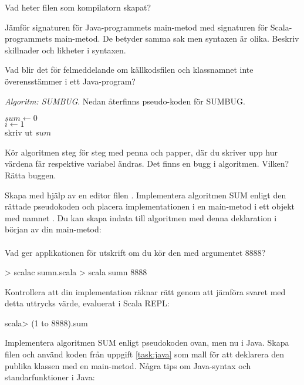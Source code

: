 \Subtask\Pen Vad heter filen som kompilatorn skapat?

\Subtask\Pen Jämför signaturen för Java-programmets main-metod med signaturen för Scala-programmets main-metod. De betyder samma sak men syntaxen är olika. Beskriv skillnader och likheter i syntaxen.

\Subtask\Pen Vad blir det för felmeddelande om källkodsfilen och klassnamnet inte överensstämmer i ett Java-program?


\Task \emph{Algoritm: SUMBUG}. Nedan återfinns pseudo-koden för SUMBUG. 

\begin{algorithm}[H]
 
 $sum \leftarrow 0$ \\
 $i \leftarrow 1$  \\
 skriv ut $sum$
\end{algorithm}

\Subtask\Pen Kör algoritmen steg för steg med penna och papper, där du skriver upp hur värdena fär respektive variabel ändras. Det finns en bugg i algoritmen. Vilken? Rätta buggen.

\Subtask Skapa med hjälp av en editor filen . Implementera algoritmen SUM enligt den rättade pseudokoden och placera implementationen i en main-metod i ett objekt med namnet . Du kan skapa indata  till algoritmen med denna deklaration i början av din main-metod: \\  \\ Vad ger applikationen för utskrift om du kör den med argumentet 8888? 

\begin{REPLnonum}
> scalac sumn.scala
> scala sumn 8888
\end{REPLnonum}

\Subtask Kontrollera att din implementation räknar rätt genom att jämföra svaret med detta uttrycks värde, evaluerat i Scala REPL:
\begin{REPLnonum}
scala> (1 to 8888).sum
\end{REPLnonum}

\Subtask Implementera algoritmen SUM enligt pseudokoden ovan, men nu i Java. Skapa filen  och använd koden från uppgift \ref{task:java} som mall för att deklarera den publika klassen  med en main-metod. Några tips om Java-syntax och standarfunktioner i Java: 

